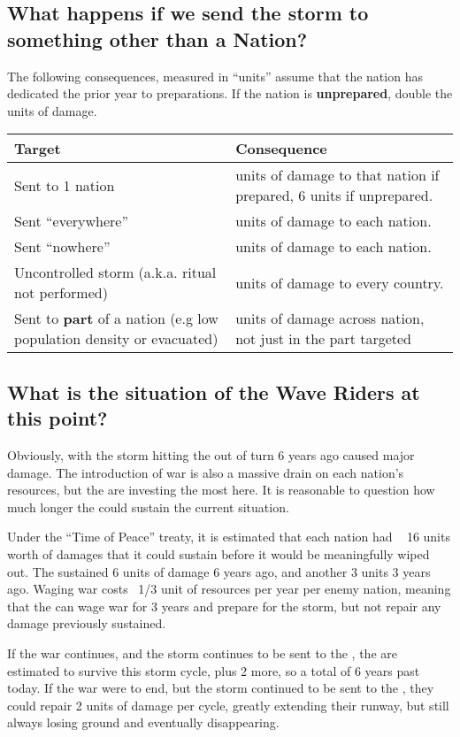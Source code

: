 \documentclass[blue]{GL2020}
\begin{document}
\subsection*{What happens if we send the storm to something other than a Nation?}
The following consequences, measured in ``units'' assume that the nation has dedicated the prior year to preparations. If the nation is \textbf{unprepared}, double the units of damage.

\begin{tabularx}{\textwidth}{ |>{\centering\arraybackslash}X |>{\centering\arraybackslash}X | }
\hline
 \textbf{Target} & \textbf{Consequence} \\ 
\hline
Sent to 1 nation & 3 units of damage to that nation if prepared, 6 units if unprepared. \\
\hline
Sent ``everywhere'' & 2 units of damage to each nation. \\
\hline  
 Sent ``nowhere'' & 3 units of damage to each nation. \\
\hline
 Uncontrolled storm (a.k.a. ritual not performed) & 4 units of damage to every country. \\
\hline
 Sent to \textbf{part} of a nation (e.g low population density or evacuated) & 4 units of damage across nation, not just in the part targeted \\
\hline
\end{tabularx}

\subsection*{What is the situation of the Wave Riders at this point?}
Obviously, with the storm hitting the \pShip{} out of turn 6 years ago caused major damage. The introduction of war is also a massive drain on each nation's resources, but the \pShip{} are investing the most here. It is reasonable to question how much longer the \pShip{} could sustain the current situation.

Under the ``Time of Peace'' treaty, it is estimated that each nation had ~ 16 units worth of damages that it could sustain before it would be meaningfully wiped out. The \pShip{} sustained 6 units of damage 6 years ago, and another 3 units 3 years ago. Waging war costs ~1/3 unit of resources per year per enemy nation, meaning that the \pShip{} can wage war for 3 years and prepare for the storm, but not repair any damage previously sustained.

If the war continues, and the storm continues to be sent to the \pShip{}, the \pShip{} are estimated to survive this storm cycle, plus 2 more, so a total of 6 years past today. If the war were to end, but the storm continued to be sent to the \pShip{}, they could repair 2 units of damage per cycle, greatly extending their runway, but still always losing ground and eventually disappearing.
\end{document}
